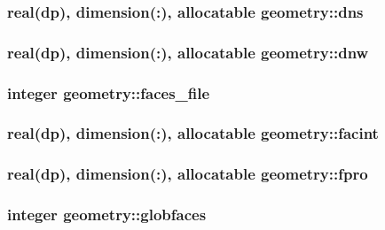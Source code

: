 \hypertarget{classgeometry_a22e8c08158c2f0faf7a3ff6527281144}{
\subsubsection[{dns}]{\setlength{\rightskip}{0pt plus 5cm}real(dp), dimension(\-:), allocatable geometry\-::dns}}\label{classgeometry_a22e8c08158c2f0faf7a3ff6527281144}
\hypertarget{classgeometry_a15d5598fc8fd8adf2a3a0218d2aef488}{
\subsubsection[{dnw}]{\setlength{\rightskip}{0pt plus 5cm}real(dp), dimension(\-:), allocatable geometry\-::dnw}}\label{classgeometry_a15d5598fc8fd8adf2a3a0218d2aef488}
\hypertarget{classgeometry_af70942cfbb3d083b361d7c30d7c7d1b8}{
\subsubsection[{faces\-\_\-file}]{\setlength{\rightskip}{0pt plus 5cm}integer geometry\-::faces\-\_\-file}}\label{classgeometry_af70942cfbb3d083b361d7c30d7c7d1b8}
\hypertarget{classgeometry_a637d800def3bd03fb7b696a0a31d23f6}{
\subsubsection[{facint}]{\setlength{\rightskip}{0pt plus 5cm}real(dp), dimension(\-:), allocatable geometry\-::facint}}\label{classgeometry_a637d800def3bd03fb7b696a0a31d23f6}
\hypertarget{classgeometry_a992699ec16084d3f8cf7423b32fc02b6}{
\subsubsection[{fpro}]{\setlength{\rightskip}{0pt plus 5cm}real(dp), dimension(\-:), allocatable geometry\-::fpro}}\label{classgeometry_a992699ec16084d3f8cf7423b32fc02b6}
\hypertarget{classgeometry_ad1e038213bb054d1e90870329c685f60}{
\subsubsection[{globfaces}]{\setlength{\rightskip}{0pt plus 5cm}integer geometry\-::globfaces}}\label{classgeometry_ad1e038213bb054d1e90870329c685f60}
